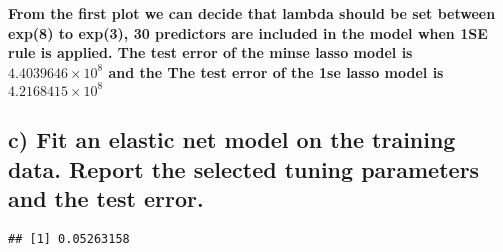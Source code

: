 \documentclass[
]{article}
\newenvironment{Shaded}{\begin{snugshade}}{\end{snugshade}}
\newcommand{\AttributeTok}[1]{\textcolor[rgb]{0.77,0.63,0.00}{#1}}
\newcommand{\DecValTok}[1]{\textcolor[rgb]{0.00,0.00,0.81}{#1}}
\newcommand{\FunctionTok}[1]{\textcolor[rgb]{0.00,0.00,0.00}{#1}}
\newcommand{\NormalTok}[1]{#1}
\newcommand{\OtherTok}[1]{\textcolor[rgb]{0.56,0.35,0.01}{#1}}
\newcommand{\SpecialCharTok}[1]{\textcolor[rgb]{0.00,0.00,0.00}{#1}}
\newcommand{\StringTok}[1]{\textcolor[rgb]{0.31,0.60,0.02}{#1}}
\begin{document}
\textbf{From the first plot we can decide that lambda should be set
between exp(8) to exp(3), 30 predictors are included in the model when
1SE rule is applied. The test error of the minse lasso model is
\ensuremath{4.4039646\times 10^{8}} and the The test error of the 1se
lasso model is \ensuremath{4.2168415\times 10^{8}}}

\hypertarget{c-fit-an-elastic-net-model-on-the-training-data.-report-the-selected-tuning-parameters-and-the-test-error.}{%
\subsection{c) Fit an elastic net model on the training data. Report the
selected tuning parameters and the test
error.}\label{c-fit-an-elastic-net-model-on-the-training-data.-report-the-selected-tuning-parameters-and-the-test-error.}}

\begin{Shaded}
\end{Shaded}

\begin{verbatim}
## [1] 0.05263158
\end{verbatim}

\begin{Shaded}
\end{Shaded}
\end{document}
